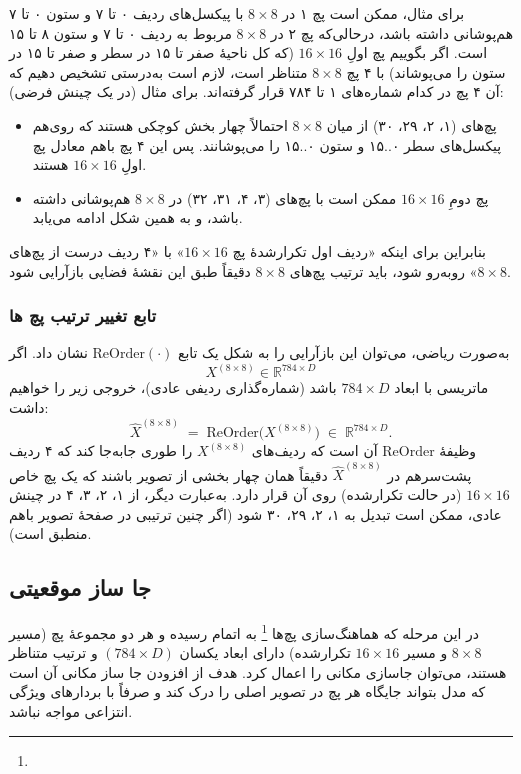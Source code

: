 برای مثال، ممکن است پچ ۱ در $8 \times 8$ با پیکسل‌های ردیف ۰ تا ۷ و ستون ۰ تا ۷ هم‌پوشانی داشته باشد، درحالی‌که پچ ۲ در $8 \times 8$ مربوط به ردیف ۰ تا ۷ و ستون ۸ تا ۱۵ است. اگر بگوییم پچ اولِ $16 \times 16$ (که کل ناحیهٔ صفر تا ۱۵ در سطر و صفر تا ۱۵ در ستون را می‌پوشاند) با ۴ پچ $8 \times 8$ متناظر است، لازم است به‌درستی تشخیص دهیم که آن ۴ پچ در کدام شماره‌های ۱ تا ۷۸۴ قرار گرفته‌اند. برای مثال (در یک چینش فرضی):
\begin{itemize}
	\item پچ‌های (۱، ۲، ۲۹، ۳۰) از میان $8 \times 8$ احتمالاً چهار بخش کوچکی هستند که روی‌هم پیکسل‌های سطر ۰..۱۵ و ستون ۰..۱۵ را می‌پوشانند. پس این ۴ پچ باهم معادل پچ اولِ $16 \times 16$ هستند.
	\item پچ دومِ $16 \times 16$ ممکن است با پچ‌های (۳، ۴، ۳۱، ۳۲) در $8 \times 8$ هم‌پوشانی داشته باشد، و به همین شکل ادامه می‌یابد.
\end{itemize}
بنابراین برای اینکه «ردیف اول تکرارشدهٔ پچ $16 \times 16$» با «۴ ردیف درست از پچ‌های $8 \times 8$» روبه‌رو شود، باید ترتیب پچ‌های $8 \times 8$ دقیقاً طبق این نقشهٔ فضایی بازآرایی  شود.

\subsubsection*{تابع تغییر ترتیب پچ ها}
به‌صورت ریاضی، می‌توان این بازآرایی را به شکل یک تابع
\(\mathrm{ReOrder}(\cdot)\)
نشان داد. اگر 
\[
X^{(8\times8)} \in \mathbb{R}^{784 \times D}
\]
ماتریسی با ابعاد $784 \times D$ باشد (شماره‌گذاری ردیفی عادی)، خروجی زیر را خواهیم داشت:
\[
\hat{X}^{(8\times8)} \;=\; \mathrm{ReOrder}\bigl(X^{(8\times8)}\bigr)\;\in\;\mathbb{R}^{784 \times D}.
\]
وظیفهٔ \(\mathrm{ReOrder}\) آن است که ردیف‌های 
\(X^{(8\times8)}\)
را طوری جابه‌جا کند که ۴ ردیف پشت‌سرهم در 
\(\hat{X}^{(8\times8)}\)
دقیقاً همان چهار بخشی از تصویر باشند که یک پچ خاص $16 \times 16$ (در حالت تکرارشده) روی آن قرار دارد. به‌عبارت دیگر، از ۱، ۲، ۳، ۴ در چینش عادی، ممکن است تبدیل به ۱، ۲، ۲۹، ۳۰ شود (اگر چنین ترتیبی در صفحهٔ تصویر باهم منطبق است).


\subsection{جا ساز موقعیتی}

در این مرحله که هماهنگ‌سازی پچ‌ها \footnote{} به اتمام رسیده و هر دو مجموعهٔ پچ (مسیر $8 \times 8$ و مسیر $16 \times 16$ تکرارشده) دارای ابعاد یکسان \((784 \times D)\) و ترتیب متناظر هستند، می‌توان جاسازی مکانی  را اعمال کرد. هدف از افزودن جا ساز مکانی آن است که مدل بتواند جایگاه هر پچ در تصویر اصلی را درک کند و صرفاً با بردارهای ویژگی انتزاعی مواجه نباشد.

